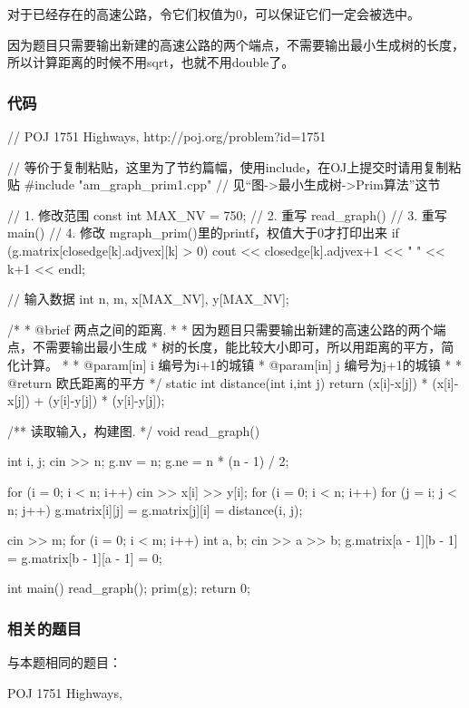 对于已经存在的高速公路，令它们权值为0，可以保证它们一定会被选中。

因为题目只需要输出新建的高速公路的两个端点，不需要输出最小生成树的长度，所以计算距离的时候不用sqrt，也就不用double了。

\subsubsection{代码}
\begin{Codex}[label=highways.cpp]
// POJ 1751 Highways, http://poj.org/problem?id=1751

// 等价于复制粘贴，这里为了节约篇幅，使用include，在OJ上提交时请用复制粘贴
#include "am_graph_prim1.cpp"  // 见“图->最小生成树->Prim算法”这节

// 1. 修改范围
const int MAX_NV = 750;
// 2. 重写 read_graph()
// 3. 重写 main()
// 4. 修改 mgraph_prim()里的printf，权值大于0才打印出来
if (g.matrix[closedge[k].adjvex][k] > 0)
    cout << closedge[k].adjvex+1 << " " << k+1 << endl;

// 输入数据 
int n, m, x[MAX_NV], y[MAX_NV];

/*
 * @brief 两点之间的距离.
 *
 * 因为题目只需要输出新建的高速公路的两个端点，不需要输出最小生成
 * 树的长度，能比较大小即可，所以用距离的平方，简化计算。
 *
 * @param[in] i 编号为i+1的城镇
 * @param[in] j 编号为j+1的城镇
 *
 * @return 欧氏距离的平方
 */
static int distance(int i,int j) {
    return (x[i]-x[j]) * (x[i]-x[j]) + (y[i]-y[j]) * (y[i]-y[j]);
}

/** 读取输入，构建图. */
void read_graph() {
    int i, j;
    cin >> n;
    g.nv = n;
    g.ne = n * (n - 1) / 2;

    for (i = 0; i < n; i++)
        cin >> x[i] >> y[i];
    for (i = 0; i < n; i++)
        for (j = i; j < n; j++)
            g.matrix[i][j] = g.matrix[j][i] = distance(i, j);

    cin >> m;
    for (i = 0; i < m; i++) {
        int a, b;
        cin >> a >> b;
        g.matrix[a - 1][b - 1] = g.matrix[b - 1][a - 1] = 0;
    }
}

int main() {
    read_graph();
    prim(g);
    return 0;
}
\end{Codex}

\subsubsection{相关的题目}
与本题相同的题目：
\begindot
\item POJ 1751 Highways, 
\myenddot

